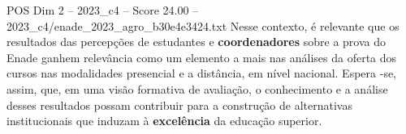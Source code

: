 \begin{textsample}{POS Dim 2 – 2023\_c4 – Score 24.00 – 2023\_c4/enade\_2023\_agro\_b30e4e3424.txt}
Nesse contexto, é relevante que os resultados das percepções de estudantes e \textbf{coordenadores} sobre a prova do Enade ganhem relevância como um elemento a mais nas análises da oferta dos cursos nas modalidades presencial e a distância, em nível nacional.
Espera -se, assim, que, em uma visão formativa de avaliação, o conhecimento e a análise desses resultados possam contribuir para a construção de alternativas institucionais que induzam à \textbf{excelência} da educação superior.

\end{textsample}
